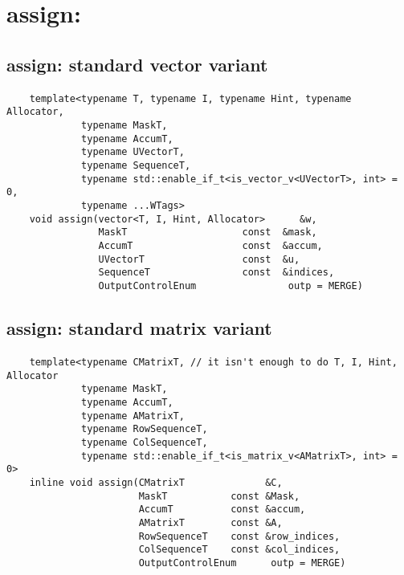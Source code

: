 \section{{\sf assign}: }

\subsection{{\sf assign}: standard vector variant}

\paragraph{\syntax}

\begin{verbatim}
    template<typename T, typename I, typename Hint, typename Allocator,
             typename MaskT,
             typename AccumT,
             typename UVectorT,
             typename SequenceT,
             typename std::enable_if_t<is_vector_v<UVectorT>, int> = 0,
             typename ...WTags>
    void assign(vector<T, I, Hint, Allocator>      &w,
                MaskT                    const  &mask,
                AccumT                   const  &accum,
                UVectorT                 const  &u,
                SequenceT                const  &indices,
                OutputControlEnum                outp = MERGE)
\end{verbatim}

\subsection{{\sf assign}: standard matrix variant}

\paragraph{\syntax}

\begin{verbatim}
    template<typename CMatrixT, // it isn't enough to do T, I, Hint, Allocator
             typename MaskT,
             typename AccumT,
             typename AMatrixT,
             typename RowSequenceT,
             typename ColSequenceT,
             typename std::enable_if_t<is_matrix_v<AMatrixT>, int> = 0>
    inline void assign(CMatrixT              &C,
                       MaskT           const &Mask,
                       AccumT          const &accum,
                       AMatrixT        const &A,
                       RowSequenceT    const &row_indices,
                       ColSequenceT    const &col_indices,
                       OutputControlEnum      outp = MERGE)
\end{verbatim}



